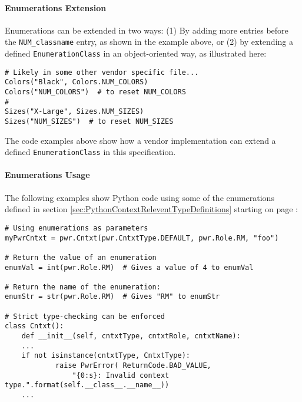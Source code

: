 \paragraph{Enumerations Extension}\label{sec:EnumerationsExtension}

Enumerations can be extended in two ways: (1) By adding more entries before the
\texttt{NUM_classname} entry, as shown in the example above, or (2) by extending a
defined \texttt{EnumerationClass} in an object-oriented way, as illustrated here:

\begin{center}\begin{minipage}{.95\linewidth}\begin{lstlisting}
# Likely in some other vendor specific file...
Colors("Black", Colors.NUM_COLORS)
Colors("NUM_COLORS")  # to reset NUM_COLORS
#
Sizes("X-Large", Sizes.NUM_SIZES)
Sizes("NUM_SIZES")  # to reset NUM_SIZES
\end{lstlisting}\end{minipage}\end{center}

The code examples above show how a vendor implementation can extend a defined
\texttt{EnumerationClass} in this specification.

\paragraph{Enumerations Usage}\label{sec:EnumerationsUsage}

The following examples show Python code using some of the enumerations defined
in section \ref{sec:PythonContextReleventTypeDefinitions} starting on page
\pageref{sec:PythonContextReleventTypeDefinitions}:

\begin{center}\begin{minipage}{.95\linewidth}\begin{lstlisting}
# Using enumerations as parameters
myPwrCntxt = pwr.Cntxt(pwr.CntxtType.DEFAULT, pwr.Role.RM, "foo")

# Return the value of an enumeration
enumVal = int(pwr.Role.RM)  # Gives a value of 4 to enumVal

# Return the name of the enumeration:
enumStr = str(pwr.Role.RM)  # Gives "RM" to enumStr

# Strict type-checking can be enforced
class Cntxt():
    def __init__(self, cntxtType, cntxtRole, cntxtName):
    ...
    if not isinstance(cntxtType, CntxtType):
            raise PwrError( ReturnCode.BAD_VALUE,
                "{0:s}: Invalid context type.".format(self.__class__.__name__))
    ...
\end{lstlisting}\end{minipage}\end{center}

